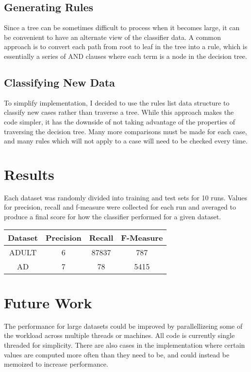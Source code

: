 \documentclass[letterpaper]{article}
\begin{document}
\subsection{Generating Rules}

Since a tree can be sometimes difficult to process when it becomes large, it can be convenient to have an alternate view of the classifier data. A common approach is to convert each path from root to leaf in the tree into a rule, which is essentially a series of  AND clauses where each term is a node in the decision tree.

\subsection{Classifying New Data}
To simplify implementation, I decided to use the rules list data structure to classify new cases rather than traverse a tree. While this approach makes the code simpler, it has the downside of not taking advantage of the properties of traversing the decision tree. Many more comparisons must be made for each case, and many rules which will not apply to a case will need to be checked every time.

\section{Results}
Each dataset was randomly divided into training and test sets for 10 runs. Values for precision, recall and f-measure were collected for each run and averaged to produce a final score for how the classifier performed for a given dataset.

\begin{center}
 \begin{tabular}{||c c c c||} 
 \hline
 Dataset & Precision & Recall & F-Measure \\ [0.5ex] 
 \hline\hline
 ADULT & 6 & 87837 & 787 \\ 
 \hline
 AD & 7 & 78 & 5415 \\
 \hline
\end{tabular}
\end{center}


\section{Future Work}
The performance for large datasets could be improved by parallellizeing some of the workload across multiple threads or machines. All code is currently single threaded for simplicity. There are also cases in the implementation where certain values are computed more often than they need to be, and could instead be memoized to increase performance.
\end{document}
